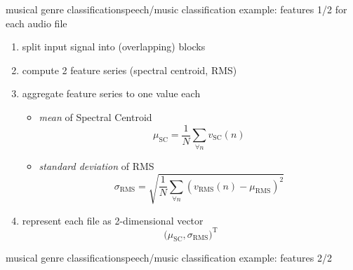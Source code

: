         \begin{frame}{musical genre classification}{speech/music classification example: features 1/2}
            for each audio file
            \begin{enumerate}
                \item	split input signal into (overlapping) blocks
                \item	compute 2 feature series (spectral centroid, RMS)
                \item<2->	aggregate feature series to one value each
                    \begin{itemize}
                        \item	\textit{mean} of Spectral Centroid
                            \begin{equation*}
                                \mu_\mathrm{SC} = \frac{1}{N}\sum_{\forall n}{v_\mathrm{SC}(n)}
                            \end{equation*}
                        \item	\textit{standard deviation} of RMS
                            \begin{equation*}
                                \sigma_\mathrm{RMS} = \sqrt{\frac{1}{N}\sum_{\forall n}{(v_\mathrm{RMS}(n)-\mu_\mathrm{RMS})^2}}
                            \end{equation*}
                    \end{itemize}
                \item<3->	represent each file as 2-dimensional vector
                    \begin{equation*}
                        \big(\mu_\mathrm{SC}, \sigma_\mathrm{RMS}\big)^\mathrm{T}
                    \end{equation*}
            \end{enumerate}				
        \end{frame}

        \begin{frame}{musical genre classification}{speech/music classification example: features 2/2}
        \end{frame}

